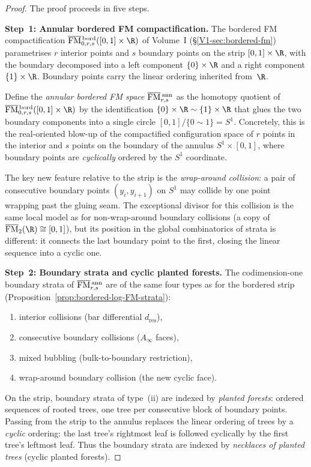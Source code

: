\begin{proof}
The proof proceeds in five steps.

\medskip\noindent
\textbf{Step~1: Annular bordered FM compactification.}
The bordered FM compactification
$\overline{\FM}{}^{\,\mathrm{bord}}_{0,r,s}([0,1] \times \R)$
of Volume~I
(\S\ref*{V1-sec:bordered-fm})
parametrises $r$ interior points and $s$ boundary points on
the strip $[0,1] \times \R$, with the boundary decomposed into
a left component $\{0\} \times \R$ and a right component
$\{1\} \times \R$. Boundary points carry the linear ordering
inherited from~$\R$.

Define the \emph{annular bordered FM space}
$\overline{\mathrm{FM}}{}^{\,\mathrm{ann}}_{r,s}$
as the homotopy quotient of
$\overline{\FM}{}^{\,\mathrm{bord}}_{0,r,s}([0,1] \times \R)$
by the identification $\{0\} \times \R \sim \{1\} \times \R$ that
glues the two boundary components into a single circle
$[0,1]/\{0 \sim 1\} = S^1$. Concretely, this is the real-oriented
blow-up of the compactified configuration space of $r$ points in
the interior and $s$ points on the boundary of the annulus
$S^1 \times [0,1]$, where boundary points are \emph{cyclically}
ordered by the $S^1$ coordinate.

The key new feature relative to the strip is the
\emph{wrap-around collision}: a pair of consecutive boundary points
$(y_i, y_{i+1})$ on $S^1$ may collide by one point wrapping past the
gluing seam. The exceptional divisor for this collision is the same
local model as for non-wrap-around boundary collisions (a copy of
$\overline{\FM}{}_2(\R) \cong [0,1]$), but its position in the
global combinatorics of strata is different: it connects the last
boundary point to the first, closing the linear sequence into a
cyclic one.

\medskip\noindent
\textbf{Step~2: Boundary strata and cyclic planted forests.}
The codimension-one boundary strata of
$\overline{\mathrm{FM}}{}^{\,\mathrm{ann}}_{r,s}$ are of the same four
types as for the bordered strip
(Proposition~\ref{prop:bordered-log-FM-strata}):
\begin{enumerate}[label=(\roman*)]
\item interior collisions (bar differential $d_{\mathrm{res}}$),
\item consecutive boundary collisions ($A_\infty$ faces),
\item mixed bubbling (bulk-to-boundary restriction),
\item wrap-around boundary collision (the new cyclic face).
\end{enumerate}
On the strip, boundary strata of type~(ii) are indexed by
\emph{planted forests}: ordered sequences of rooted trees, one
tree per consecutive block of boundary points. Passing from the
strip to the annulus replaces the linear ordering of trees by a
\emph{cyclic} ordering: the last tree's rightmost leaf is followed
cyclically by the first tree's leftmost leaf. Thus the boundary
strata are indexed by \emph{necklaces of planted trees}
(cyclic planted forests).


\end{proof}
